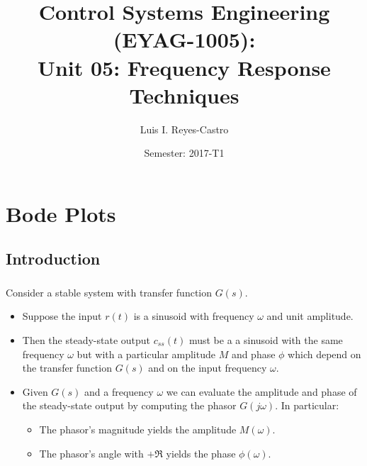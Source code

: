 \documentclass[ 10pt, xcolor = dvipsnames]{beamer}
\title[\shorttitle]{Control Systems Engineering (EYAG-1005): \\ \textbf{Unit 05:} Frequency Response Techniques }
\author[L. I. Reyes-Castro]{Luis I. Reyes-Castro}
\institute[ESPOL]{\normalsize Escuela Superior Polit\'ecnica del Litoral (ESPOL) \\ Guayaquil - Ecuador}
\date[2017-T1]{Semester: 2017-T1}
\begin{document}



\section{Bode Plots}

\subsection{Introduction}

\begin{frame}[allowframebreaks]
\frametitle{\insertsection}

Consider a stable system with transfer function $G(s)$. 
\begin{itemize}
\item Suppose the input $r(t)$ is a sinusoid with frequency $\omega$ and unit amplitude. 
\item Then the steady-state output $c_{ss}(t)$ must be a a sinusoid with the same frequency $\omega$ but with a particular amplitude $M$ and phase $\phi$ which depend \linebreak on the transfer function $G(s)$ and on the input frequency $\omega$. 
\end{itemize}
\halfskip

\begin{figure}[htb]
\centering
\def\svgwidth{0.8\columnwidth}

\end{figure}
\framebreak

\begin{itemize}
\item Given $G(s)$ and a frequency $\omega$ we can evaluate the amplitude and phase of the steady-state output by computing the phasor $G(j\omega)$. In particular: 
\begin{itemize}
\item The phasor's magnitude yields the amplitude $M(\omega)$. 
\item The phasor's angle with $+\Re$ yields the phase $\phi(\omega)$. 
\end{itemize}
\halfskip
\begin{figure}[htb]
\centering
\def\svgwidth{0.72\columnwidth}

\end{figure}


\end{itemize}
\end{frame}
\end{document}
